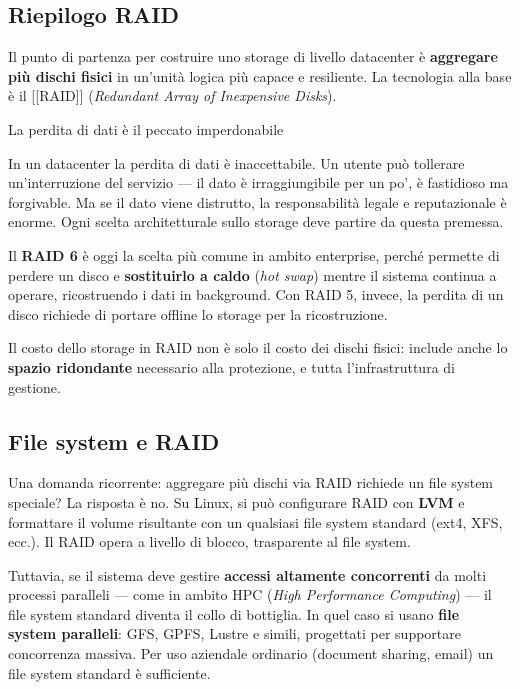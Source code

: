 \documentclass[
  italian,
  openany]{book}
\begin{document}
\subsection{Riepilogo RAID}\label{riepilogo-raid}

Il punto di partenza per costruire uno storage di livello datacenter è
\textbf{aggregare più dischi fisici} in un'unità logica più capace e
resiliente. La tecnologia alla base è il {[}{[}RAID{]}{]}
(\emph{Redundant Array of Inexpensive Disks}).

\begin{calloutwarning}{La perdita di dati è il peccato imperdonabile}

In un datacenter la perdita di dati è inaccettabile. Un utente può
tollerare un'interruzione del servizio --- il dato è irraggiungibile per
un po', è fastidioso ma forgivable. Ma se il dato viene distrutto, la
responsabilità legale e reputazionale è enorme. Ogni scelta
architetturale sullo storage deve partire da questa premessa.

\end{calloutwarning}

Il \textbf{RAID 6} è oggi la scelta più comune in ambito enterprise,
perché permette di perdere un disco e \textbf{sostituirlo a caldo}
(\emph{hot swap}) mentre il sistema continua a operare, ricostruendo i
dati in background. Con RAID 5, invece, la perdita di un disco richiede
di portare offline lo storage per la ricostruzione.

Il costo dello storage in RAID non è solo il costo dei dischi fisici:
include anche lo \textbf{spazio ridondante} necessario alla protezione,
e tutta l'infrastruttura di gestione.

\subsection{File system e RAID}\label{file-system-e-raid}

Una domanda ricorrente: aggregare più dischi via RAID richiede un file
system speciale? La risposta è no. Su Linux, si può configurare RAID con
\textbf{LVM} e formattare il volume risultante con un qualsiasi file
system standard (ext4, XFS, ecc.). Il RAID opera a livello di blocco,
trasparente al file system.

Tuttavia, se il sistema deve gestire \textbf{accessi altamente
concorrenti} da molti processi paralleli --- come in ambito HPC
(\emph{High Performance Computing}) --- il file system standard diventa
il collo di bottiglia. In quel caso si usano \textbf{file system
paralleli}: GFS, GPFS, Lustre e simili, progettati per supportare
concorrenza massiva. Per uso aziendale ordinario (document sharing,
email) un file system standard è sufficiente.
\end{document}
